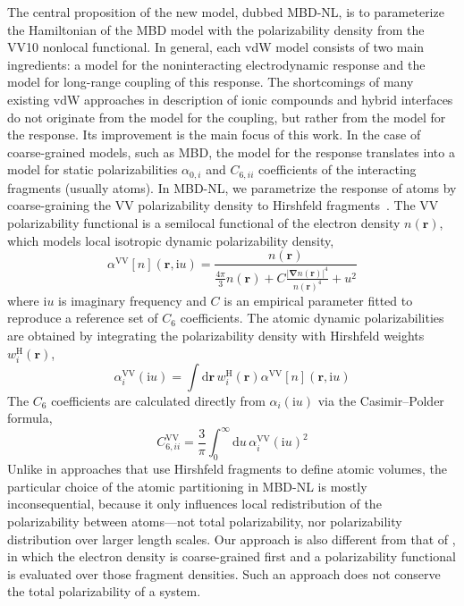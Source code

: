 The central proposition of the new model, dubbed MBD-NL, is to parameterize the Hamiltonian of the MBD model with the polarizability density from the VV10 nonlocal functional.
In general, each vdW model consists of two main ingredients: a model for the noninteracting electrodynamic response and the model for long-range coupling of this response.
The shortcomings of many existing vdW approaches in description of ionic compounds and hybrid interfaces do not originate from the model for the coupling, but rather from the model for the response.
Its improvement is the main focus of this work.
In the case of coarse-grained models, such as MBD, the model for the response translates into a model for static polarizabilities $\alpha_{0,i}$ and $C_{6,ii}$ coefficients of the interacting fragments (usually atoms).
In MBD-NL, we parametrize the response of atoms by coarse-graining the VV polarizability density to Hirshfeld fragments~\citep{HirshfeldTCA77,SatoJCP09,SatoJCP10}.
The VV polarizability functional is a semilocal functional of the electron density $n(\mathbf r)$, which models local isotropic dynamic polarizability density,
\begin{equation}
   \alpha^\text{VV}[n](\mathbf r,\mathrm iu)=\frac{n(\mathbf r)}{\frac{4\pi}3n(\mathbf r)+C\frac{{|\boldsymbol\nabla n(\mathbf r)|}^4}{n{(\mathbf r)}^4}+u^2}
   \label{eq:vv-functional}
\end{equation}
where $\mathrm iu$ is imaginary frequency and $C$ is an empirical parameter fitted to reproduce a reference set of $C_6$ coefficients.
The atomic dynamic polarizabilities are obtained by integrating the polarizability density with Hirshfeld weights $w_i^\text{H}(\mathbf r)$,
\begin{equation}
  \alpha_i^\text{VV}(\mathrm iu)=\int\mathrm d\mathbf r\,w_i^\text{H}(\mathbf r)\alpha^\text{VV}[n](\mathbf r,\mathrm iu)
\end{equation}
The $C_6$ coefficients are calculated directly from $\alpha_i(\mathrm iu)$ via the Casimir--Polder formula,
\begin{equation}
  C_{6,ii}^\text{VV}=\frac3\pi\int_0^\infty\mathrm du\,\alpha_i^\text{VV}{(\mathrm iu)}^2
\end{equation}
Unlike in approaches that use Hirshfeld fragments to define atomic volumes, the particular choice of the atomic partitioning in MBD-NL is mostly inconsequential, because it only influences local redistribution of the polarizability between atoms---not total polarizability, nor polarizability distribution over larger length scales.
Our approach is also different from that of \citet{SilvestrelliPRL08}, in which the electron density is coarse-grained first and a polarizability functional is evaluated over those fragment densities.
Such an approach does not conserve the total polarizability of a system.


